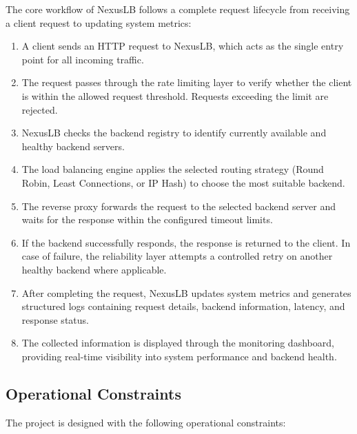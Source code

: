 \documentclass[11pt,a4paper]{article}
\begin{document}
The core workflow of NexusLB follows a complete request lifecycle from receiving a client request to updating system metrics:

\begin{enumerate}
    \item A client sends an HTTP request to NexusLB, which acts as the single entry point for all incoming traffic.

    \item The request passes through the rate limiting layer to verify whether the client is within the allowed request threshold. Requests exceeding the limit are rejected.

    \item NexusLB checks the backend registry to identify currently available and healthy backend servers.

    \item The load balancing engine applies the selected routing strategy (Round Robin, Least Connections, or IP Hash) to choose the most suitable backend.

    \item The reverse proxy forwards the request to the selected backend server and waits for the response within the configured timeout limits.

    \item If the backend successfully responds, the response is returned to the client. In case of failure, the reliability layer attempts a controlled retry on another healthy backend where applicable.

    \item After completing the request, NexusLB updates system metrics and generates structured logs containing request details, backend information, latency, and response status.

    \item The collected information is displayed through the monitoring dashboard, providing real-time visibility into system performance and backend health.
\end{enumerate}


\subsection{Operational Constraints}

The project is designed with the following operational constraints:
\end{document}
